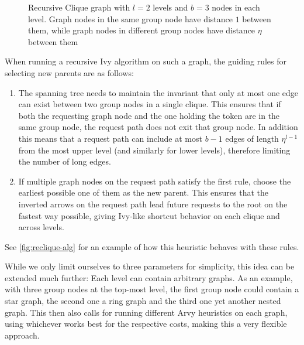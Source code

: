 \documentclass[a4paper, oneside]{discothesis}
\begin{document}
\begin{figure}[H]
\caption{Recursive Clique graph with $l=2$ levels and $b=3$ nodes in each level. Graph nodes in the same group node have distance $1$ between them, while graph nodes in different group nodes have distance $\eta$ between them}
\label{fig:reclique}
\end{figure}

When running a recursive Ivy algorithm on such a graph, the guiding rules for selecting new parents are as follows:
\begin{enumerate}
\item\label{reclique-invariant} The spanning tree needs to maintain the invariant that only at most one edge can exist between two group nodes in a single clique. This ensures that if both the requesting graph node and the one holding the token are in the same group node, the request path does not exit that group node. In addition this means that a request path can include at most $b-1$ edges of length $\eta^{l-1}$ from the most upper level (and similarly for lower levels), therefore limiting the number of long edges.
\item If multiple graph nodes on the request path satisfy the first rule, choose the earliest possible one of them as the new parent. This ensures that the inverted arrows on the request path lead future requests to the root on the fastest way possible, giving Ivy-like shortcut behavior on each clique and across levels.
\label{reclique-rule-early}
\end{enumerate}

See \autoref{fig:reclique-alg} for an example of how this heuristic behaves with these rules.

While we only limit ourselves to three parameters for simplicity, this idea can be extended much further: Each level can contain arbitrary graphs. As an example, with three group nodes at the top-most level, the first group node could contain a star graph, the second one a ring graph and the third one yet another nested graph. This then also calls for running different Arvy heuristics on each graph, using whichever works best for the respective costs, making this a very flexible approach.
\end{document}
